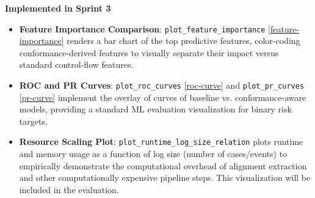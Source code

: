 \documentclass[12pt,a4paper]{article}
\newcommand{\newcov}[1]{\colorbox{green!40}{\textbf{#1}}}
\begin{document}
\noindent \textbf{Implemented in Sprint 3}
\begin{itemize}
    \item \newcov{Feature Importance Comparison}: \texttt{plot\_feature\_importance} \ref{feature-importance} renders a bar chart of the top predictive features, color-coding conformance-derived features to visually separate their impact versus standard control-flow features.
    \item \newcov{ROC and PR Curves}: \texttt{plot\_roc\_curves} \ref{roc-curve} and \texttt{plot\_pr\_curves} \ref{pr-curve} implement the overlay of curves of baseline vs. conformance-aware models, providing a standard ML evaluation visualization for binary risk targets.
    \item \newcov{Resource Scaling Plot}: \texttt{plot\_runtime\_log\_size\_relation} plots runtime and memory usage as a function of log size (number of cases/events) to empirically demonstrate the computational overhead of alignment extraction and other computationally expensive pipeline steps. This visualization will be included in the evaluation.
\end{itemize}
\end{document}
